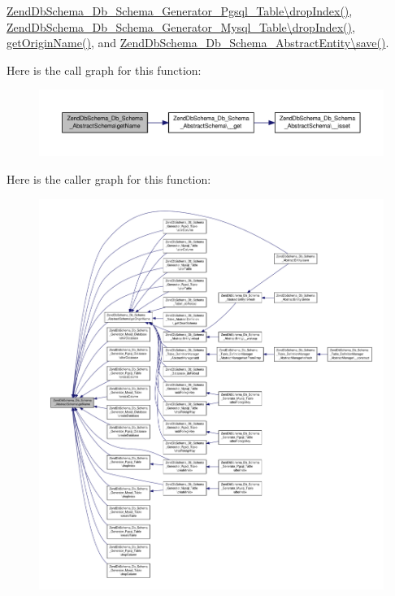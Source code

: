 \hyperlink{Generator_2Pgsql_2Table_8php_source_l00256}{Zend\-Db\-Schema\-\_\-\-Db\-\_\-\-Schema\-\_\-\-Generator\-\_\-\-Pgsql\-\_\-\-Table\textbackslash{}drop\-Index()}, \hyperlink{Generator_2Mysql_2Table_8php_source_l00264}{Zend\-Db\-Schema\-\_\-\-Db\-\_\-\-Schema\-\_\-\-Generator\-\_\-\-Mysql\-\_\-\-Table\textbackslash{}drop\-Index()}, \hyperlink{AbstractSchema_8php_source_l00314}{get\-Origin\-Name()}, and \hyperlink{AbstractEntity_8php_source_l00169}{Zend\-Db\-Schema\-\_\-\-Db\-\_\-\-Schema\-\_\-\-Abstract\-Entity\textbackslash{}save()}.



Here is the call graph for this function\-:\nopagebreak
\begin{figure}[H]
\begin{center}
\leavevmode
\includegraphics[width=350pt]{classZendDbSchema__Db__Schema__AbstractSchema_a55787c21deddba427842809d589c2df6_cgraph}
\end{center}
\end{figure}




Here is the caller graph for this function\-:\nopagebreak
\begin{figure}[H]
\begin{center}
\leavevmode
\includegraphics[width=350pt]{classZendDbSchema__Db__Schema__AbstractSchema_a55787c21deddba427842809d589c2df6_icgraph}
\end{center}
\end{figure}


